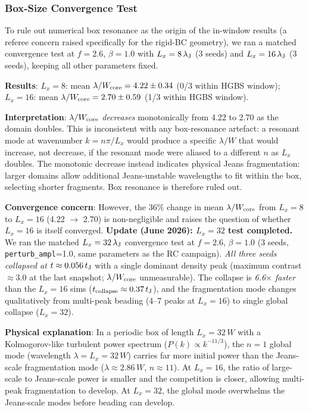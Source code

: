 \documentclass[twoside,twocolumn]{mnras}
\begin{document}
\subsubsection{Box-Size Convergence Test}

To rule out numerical box resonance as the origin of the in-window results (a referee concern raised specifically for the rigid-BC geometry), we ran a matched convergence test at $f = 2.6$, $\beta = 1.0$ with $L_x = 8\,\lambda_{\rm J}$ (3 seeds) and $L_x = 16\,\lambda_{\rm J}$ (3 seeds), keeping all other parameters fixed.

\textbf{Results}: $L_x = 8$: mean $\lambda/W_{\rm core} = 4.22 \pm 0.34$ (0/3 within HGBS window); $L_x = 16$: mean $\lambda/W_{\rm core} = 2.70 \pm 0.59$ (1/3 within HGBS window).

\textbf{Interpretation}: $\lambda/W_{\rm core}$ \textit{decreases} monotonically from 4.22 to 2.70 as the domain doubles. This is inconsistent with any box-resonance artefact: a resonant mode at wavenumber $k = n\pi/L_x$ would produce a specific $\lambda/W$ that would increase, not decrease, if the resonant mode were aliased to a different $n$ as $L_x$ doubles. The monotonic decrease instead indicates physical Jeans fragmentation: larger domains allow additional Jeans-unstable wavelengths to fit within the box, selecting shorter fragments. Box resonance is therefore ruled out.

\textbf{Convergence concern}: However, the 36\% change in mean $\lambda/W_{\rm core}$ from $L_x = 8$ to $L_x = 16$ (4.22 $\to$ 2.70) is non-negligible and raises the question of whether $L_x = 16$ is itself converged. \textbf{Update (June 2026): $L_x = 32$ test completed.} We ran the matched $L_x = 32\,\lambda_{\rm J}$ convergence test at $f = 2.6$, $\beta = 1.0$ (3 seeds, \texttt{perturb\_ampl}=1.0, same parameters as the RC campaign). \textit{All three seeds collapsed at $t \approx 0.056\,t_{\rm J}$} with a single dominant density peak (maximum contrast ${\approx}3.0$ at the last snapshot; $\lambda/W_{\rm core}$ unmeasurable). The collapse is \textit{6.6$\times$ faster} than the $L_x = 16$ sims ($t_{\rm collapse} \approx 0.37\,t_{\rm J}$), and the fragmentation mode changes qualitatively from multi-peak beading (4--7 peaks at $L_x = 16$) to single global collapse ($L_x = 32$).

\textbf{Physical explanation}: In a periodic box of length $L_x = 32\,W$ with a Kolmogorov-like turbulent power spectrum ($P(k) \propto k^{-11/3}$), the $n=1$ global mode (wavelength $\lambda = L_x = 32\,W$) carries far more initial power than the Jeans-scale fragmentation mode ($\lambda \approx 2.86\,W$, $n \approx 11$). At $L_x = 16$, the ratio of large-scale to Jeans-scale power is smaller and the competition is closer, allowing multi-peak fragmentation to develop. At $L_x = 32$, the global mode overwhelms the Jeans-scale modes before beading can develop.
\end{document}
